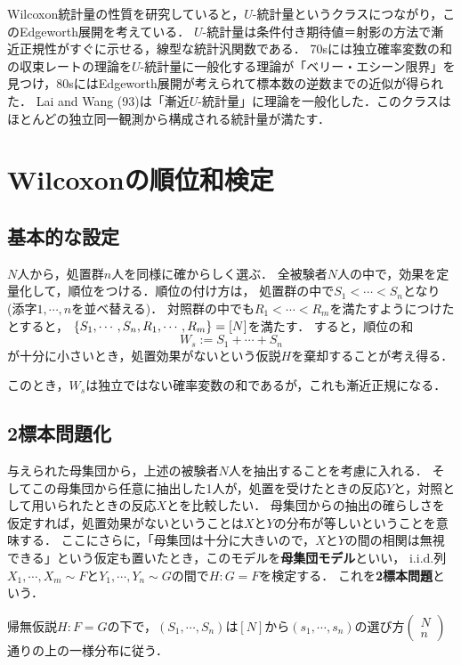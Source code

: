 \documentclass[uplatex,dvipdfmx]{jsreport}
\begin{document}
\begin{history}[前園さんの研究]
    Wilcoxon統計量の性質を研究していると，$U$-統計量というクラスにつながり，このEdgeworth展開を考えている．
    $U$-統計量は条件付き期待値＝射影の方法で漸近正規性がすぐに示せる，線型な統計汎関数である．
    70sには独立確率変数の和の収束レートの理論を$U$-統計量に一般化する理論が「ベリー・エシーン限界」を見つけ，80sにはEdgeworth展開が考えられて標本数の逆数までの近似が得られた．
    Lai and Wang (93)は「漸近$U$-統計量」に理論を一般化した．このクラスはほとんどの独立同一観測から構成される統計量が満たす．
\end{history}

\section{Wilcoxonの順位和検定}

\subsection{基本的な設定}

$N$人から，処置群$n$人を同様に確からしく選ぶ．
全被験者$N$人の中で，効果を定量化して，順位をつける．順位の付け方は，
処置群の中で$S_1<\cdots<S_n$となり(添字$1,\cdots,n$を並べ替える)．
対照群の中でも$R_1<\cdots<R_m$を満たすようにつけたとすると，
$\left\{S_1,\cdots,S_n,R_1,\cdots,R_m\right\}=[N]$を満たす．
すると，順位の和
\[W_s:=S_1+\cdots+S_n\]
が十分に小さいとき，処置効果がないという仮説$H$を棄却することが考え得る．

このとき，$W_s$は独立ではない確率変数の和であるが，これも漸近正規になる．

\subsection{2標本問題化}

与えられた母集団から，上述の被験者$N$人を抽出することを考慮に入れる．
そしてこの母集団から任意に抽出した1人が，処置を受けたときの反応$Y$と，対照として用いられたときの反応$X$とを比較したい．
母集団からの抽出の確らしさを仮定すれば，処置効果がないということは$X$と$Y$の分布が等しいということを意味する．
ここにさらに，「母集団は十分に大きいので，$X$と$Y$の間の相関は無視できる」という仮定も置いたとき，このモデルを\textbf{母集団モデル}といい，
i.i.d.列$X_1,\cdots,X_m\sim F$と$Y_1,\cdots,Y_n\sim G$の間で$H:G=F$を検定する．
これを\textbf{2標本問題}という．

\begin{theorem}
    帰無仮説$H:F=G$の下で，$(S_1,\cdots,S_n)$は$[N]$から$(s_1,\cdots,s_n)$の選び方$\begin{pmatrix}N\\n\end{pmatrix}$通りの上の一様分布に従う．
\end{theorem}
\end{document}
